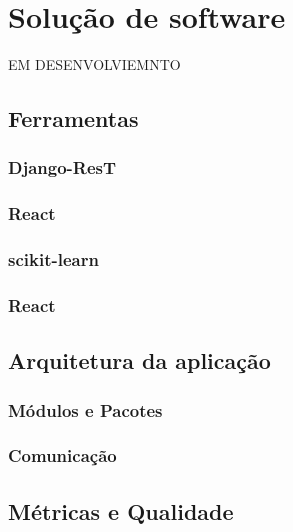 \chapter[Solução de software]{Solução de software}
EM DESENVOLVIEMNTO
\section{Ferramentas}
\subsection{Django-ResT}
\subsection{React}
\subsection{scikit-learn}
\subsection{React}

\section{Arquitetura da aplicação}
\subsection{Módulos e Pacotes}
\subsection{Comunicação}

\section{Métricas e Qualidade}